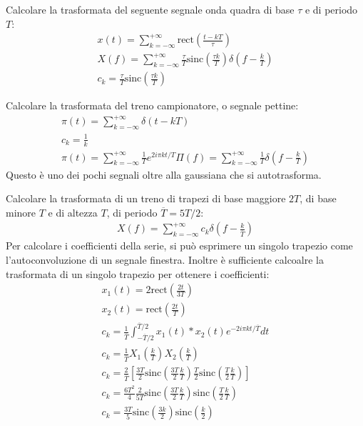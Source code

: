 \documentclass{article}
\numberwithin{equation}{subsection}
\begin{document}
Calcolare la trasformata del seguente segnale onda quadra di base $\tau$ e di periodo $T$:
\begin{gather*}
    x(t)=\displaystyle\sum_{k=-\infty}^{+\infty}\mbox{rect}\left(\frac{t-kT}{\tau}\right)\\
    X(f)=\displaystyle\sum_{k=-\infty}^{+\infty}\frac{\tau}{T}\mbox{sinc}\left(\frac{\tau k}{T}\right)\delta\left(f-\frac{k}{T}\right)\\
    c_k=\displaystyle\frac{\tau}{T}\mbox{sinc}\left(\frac{\tau k}{T}\right)
\end{gather*}

Calcolare la trasformata del treno campionatore, o segnale pettine:
\begin{gather*}
    \pi(t)=\displaystyle\sum_{k=-\infty}^{+\infty}\delta(t-kT)\\
    c_k=\displaystyle\frac{1}{k}\\
    \pi(t)=\displaystyle\sum_{k=-\infty}^{+\infty}\frac{1}{T}e^{2i\pi kt/T}
    \Pi(f)=\displaystyle\sum_{k=-\infty}^{+\infty}\frac{1}{T}\delta\left(f-\frac{k}{T}\right)
\end{gather*}
Questo è uno dei pochi segnali oltre alla gaussiana che si autotrasforma. 


Calcolare la trasformata di un treno di trapezi di base maggiore $2T$, di base minore $T$ e di altezza $T$, di periodo $\overline T=5T/2$:
\begin{gather*}
    X(f)=\displaystyle\sum_{k=-\infty}^{+\infty}c_k\delta\left(f-\frac{k}{\overline T}\right)
\end{gather*}
Per calcolare i coefficienti della serie, si può esprimere un singolo trapezio come l'autoconvoluzione di un segnale finestra. Inoltre è sufficiente calcoalre la 
trasformata di un singolo trapezio per ottenere i coefficienti:
\begin{gather*}
    x_1(t)=2\displaystyle\mbox{rect}\left(\frac{2t}{3T}\right)\\
    x_2(t)=\displaystyle\mbox{rect}\left(\frac{2t}{T}\right)\\
    c_k=\displaystyle\frac{1}{\overline T}\int_{-\overline T/2}^{\overline T/2}x_1(t)*x_2(t)e^{-2i\pi kt/\overline T}dt\\
    c_k=\displaystyle\frac{1}{\overline T}X_1\left(\frac{k}{ T}\right)X_2\left(\frac{k}{ T}\right)\\
    c_k=\displaystyle\frac{2}{\overline T}\left[\frac{3T}{2}\mbox{sinc}\left(\frac{3T}{2}\frac{k}{ T}\right)\frac{T}{2}\mbox{sinc}\left(\frac{T}{2}\frac{k}{ T}\right)\right]\\
    c_k=\displaystyle\frac{6T^2}{4}\frac{2}{5T}\mbox{sinc}\left(\frac{3T}{2}\frac{k}{ T}\right)\mbox{sinc}\left(\frac{T}{2}\frac{k}{ T}\right)\\
    c_k=\displaystyle\frac{3T}{5}\mbox{sinc}\left(\frac{3k}{2}\right)\mbox{sinc}\left(\frac{k}{2}\right)
\end{gather*}
\end{document}
